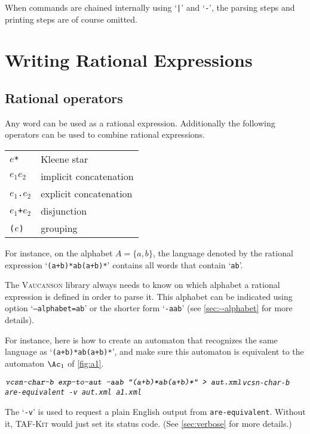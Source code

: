 \documentclass[a4paper]{report}
\newcommand{\bslash}{\texttt{\symbol{92}}}
\newenvironment{shell}
{\begin{alltt}}
{\end{alltt}}
\newcommand\kbd[1]{\textsl{\texttt{#1}}}
\newcommand\command[1]{\texttt{#1}}
\newcommand\code[1]{\texttt{#1}}
\newcommand\samp[1]{`\texttt{#1}'}
\newcommand\option[1]{`\texttt{#1}'}
\newcommand{\tafkit}{\textsc{TAF-Kit}\xspace}
\newcommand{\Vauc}{\textsc{Vaucanson}\xspace}
\begin{document}
When commands are chained internally using \samp{\bslash|} and
\samp{-}, the parsing steps and printing steps are of course omitted.


\section{Writing Rational Expressions}

\subsection{Rational operators}

Any word can be used as a rational expression.  Additionally the
following operators can be used to combine rational expressions.

\begin{center}
  \begin{tabular}{ll}
    \hline
    $e$\code{*} & Kleene star \\
    $e_1$$e_2$ & implicit concatenation \\
    $e_1$\code{.}$e_2$ & explicit concatenation \\
    $e_1$\code{+}$e_2$ & disjunction \\
    \code{(}$e$\code{)} & grouping \\
    \hline
  \end{tabular}
\end{center}

For instance, on the alphabet $A=\{a,b\}$, the language denoted
by the rational expression \samp{(a+b)*ab(a+b)*} contains all words
that contain \samp{ab}.

The \Vauc library always needs to know on which alphabet a rational
expression is defined in order to parse it.  This alphabet can be
indicated using option \option{--alphabet=ab} or the shorter form
\option{-aab} (see \autoref{sec:--alphabet} for more details).

For instance, here is how to create an automaton that recognizes the
same language as \samp{(a+b)*ab(a+b)*}, and make sure this automaton
is equivalent to the automaton $\Ac_1$ of \autoref{fig:a1}.

\begin{shell}
$ \kbd{vcsn-char-b exp-to-aut -aab "(a+b)*ab(a+b)*" > aut.xml}
$ \kbd{vcsn-char-b are-equivalent -v aut.xml a1.xml}
\end{shell}%

\noindent The \option{-v} is used to request a plain English output
from \command{are-equivalent}.  Without it, \tafkit would just set its
status code.  (See \autoref{sec:verbose} for more details.)
\end{document}
